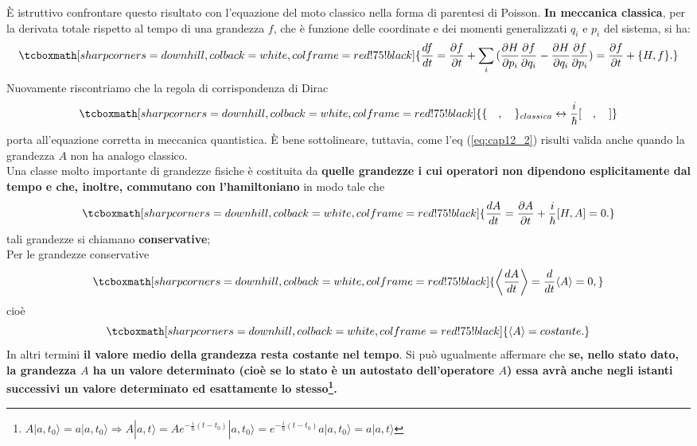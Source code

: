 \documentclass[a4paper,12pt,oneside]{book}
\begin{document}
È istruttivo confrontare questo risultato con l'equazione del moto classico nella forma di parentesi di Poisson. \textbf{In meccanica classica}, per la derivata totale rispetto al tempo di una grandezza $f$, che è funzione delle coordinate e dei momenti generalizzati $q_i$ e $p_i$ del sistema, si ha:
	\begin{equation}
		\tcboxmath[sharp corners=downhill, colback=white, colframe=red!75!black]{
			\frac{df}{dt}= \frac{\partial f}{\partial{t}} + \sum_{i}^{}{(\frac{\partial H}{\partial{p_i}}\frac{\partial f}{\partial{q_i}} - \frac{\partial H}{\partial{q_i}}\frac{\partial f}{\partial{p_i}}} )=
\frac{\partial f}{\partial{t}}+ \{H,f\}.
			}
	\end{equation}
Nuovamente riscontriamo che la regola di corrispondenza di Dirac 
	\begin{equation}
		\tcboxmath[sharp corners=downhill, colback=white, colframe=red!75!black]{
			\{ \quad,\quad   \}_{classica}  \leftrightarrow \frac{i}{\hbar} [ \quad, \quad]
			}
	\end{equation}
porta all'equazione corretta in meccanica quantistica. È bene sottolineare, tuttavia, come l'eq (\ref{eq:cap12_2}) risulti valida anche quando la grandezza $A$ non ha analogo classico.\\

Una classe molto importante di grandezze fisiche è costituita da \textbf{quelle grandezze i cui operatori non dipendono esplicitamente dal tempo e che, inoltre, commutano con l'hamiltoniano} in modo tale che 
	\begin{equation}
		\tcboxmath[sharp corners=downhill, colback=white, colframe=red!75!black]{
			\frac{dA}{dt}= \frac{\partial A}{\partial{t}} + \frac{i}{\hbar}[H,A]=0.
			}
	\end{equation}
tali grandezze si chiamano \textbf{conservative};\\

Per le grandezze conservative 
	\begin{equation} 
		\tcboxmath[sharp corners=downhill, colback=white, colframe=red!75!black]{
			\left\langle \frac{dA}{dt}\right\rangle= \frac{d}{dt}\langle A \rangle =0,
			}
	\end{equation}
cioè 
	\begin{equation}
		\tcboxmath[sharp corners=downhill, colback=white, colframe=red!75!black]{
			\langle A \rangle= costante.
			}
	\end{equation}
In altri termini \textbf{il valore medio della grandezza resta costante nel tempo}. Si può ugualmente affermare che \textbf{se, nello stato dato, la grandezza $A$ ha un valore determinato (cioè se lo stato è un autostato dell'operatore $A$) essa avrà anche negli istanti successivi un valore determinato ed esattamente lo stesso\footnote{$A| a, t_0\rangle= a |a,t_0\rangle \Rightarrow A|a, t \rangle = Ae^{-\frac{i}{\hbar}(t-t_0)}|a,t_0\rangle=e^{-\frac{i}{\hbar}(t-t_0)}a|a,t_0\rangle=a|a,t\rangle$}.}\\
\end{document}

